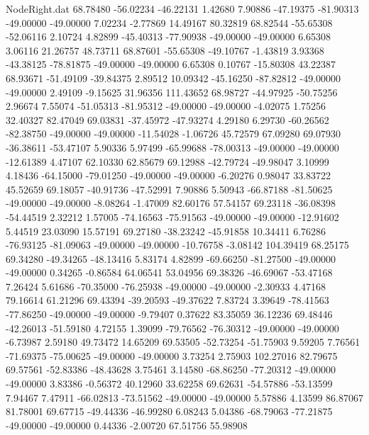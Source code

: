 \begin{filecontents}{NodeRight.dat}
  68.78480  -56.02234  -46.22131     1.42680    7.90886  -47.19375  -81.90313  -49.00000  -49.00000    7.02234   -2.77869   14.49167   80.32819
  68.82544  -55.65308  -52.06116     2.10724    4.82899  -45.40313  -77.90938  -49.00000  -49.00000    6.65308    3.06116   21.26757   48.73711
  68.87601  -55.65308  -49.10767    -1.43819    3.93368  -43.38125  -78.81875  -49.00000  -49.00000    6.65308    0.10767  -15.80308   43.22387
  68.93671  -51.49109  -39.84375     2.89512   10.09342  -45.16250  -87.82812  -49.00000  -49.00000    2.49109   -9.15625   31.96356  111.43652
  68.98727  -44.97925  -50.75256     2.96674    7.55074  -51.05313  -81.95312  -49.00000  -49.00000   -4.02075    1.75256   32.40327   82.47049
  69.03831  -37.45972  -47.93274     4.29180    6.29730  -60.26562  -82.38750  -49.00000  -49.00000  -11.54028   -1.06726   45.72579   67.09280
  69.07930  -36.38611  -53.47107     5.90336    5.97499  -65.99688  -78.00313  -49.00000  -49.00000  -12.61389    4.47107   62.10330   62.85679
  69.12988  -42.79724  -49.98047     3.10999    4.18436  -64.15000  -79.01250  -49.00000  -49.00000   -6.20276    0.98047   33.83722   45.52659
  69.18057  -40.91736  -47.52991     7.90886    5.50943  -66.87188  -81.50625  -49.00000  -49.00000   -8.08264   -1.47009   82.60176   57.54157
  69.23118  -36.08398  -54.44519     2.32212    1.57005  -74.16563  -75.91563  -49.00000  -49.00000  -12.91602    5.44519   23.03090   15.57191
  69.27180  -38.23242  -45.91858    10.34411    6.76286  -76.93125  -81.09063  -49.00000  -49.00000  -10.76758   -3.08142  104.39419   68.25175
  69.34280  -49.34265  -48.13416     5.83174    4.82899  -69.66250  -81.27500  -49.00000  -49.00000    0.34265   -0.86584   64.06541   53.04956
  69.38326  -46.69067  -53.47168     7.26424    5.61686  -70.35000  -76.25938  -49.00000  -49.00000   -2.30933    4.47168   79.16614   61.21296
  69.43394  -39.20593  -49.37622     7.83724    3.39649  -78.41563  -77.86250  -49.00000  -49.00000   -9.79407    0.37622   83.35059   36.12236
  69.48446  -42.26013  -51.59180     4.72155    1.39099  -79.76562  -76.30312  -49.00000  -49.00000   -6.73987    2.59180   49.73472   14.65209
  69.53505  -52.73254  -51.75903     9.59205    7.76561  -71.69375  -75.00625  -49.00000  -49.00000    3.73254    2.75903  102.27016   82.79675
  69.57561  -52.83386  -48.43628     3.75461    3.14580  -68.86250  -77.20312  -49.00000  -49.00000    3.83386   -0.56372   40.12960   33.62258
  69.62631  -54.57886  -53.13599     7.94467    7.47911  -66.02813  -73.51562  -49.00000  -49.00000    5.57886    4.13599   86.87067   81.78001
  69.67715  -49.44336  -46.99280     6.08243    5.04386  -68.79063  -77.21875  -49.00000  -49.00000    0.44336   -2.00720   67.51756   55.98908

\end{filecontents}

